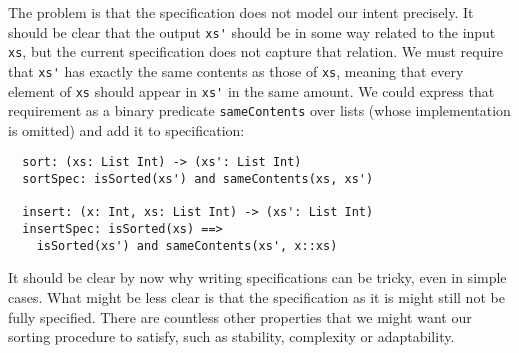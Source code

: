 

The problem is that the specification does not model our intent precisely. It
should be clear that the output \lstinline{xs'} should be in some way related to
the input \lstinline{xs}, but the current specification does not capture that
relation. We must require that \lstinline{xs'} has exactly the same contents as
those of \lstinline{xs}, meaning that every element of \lstinline{xs} should
appear in \lstinline{xs'} in the same amount. We could express that requirement
as a binary predicate \lstinline{sameContents} over lists (whose implementation
is omitted) and add it to specification:

\begin{lstlisting}
  sort: (xs: List Int) -> (xs': List Int)
  sortSpec: isSorted(xs') and sameContents(xs, xs')

  insert: (x: Int, xs: List Int) -> (xs': List Int)
  insertSpec: isSorted(xs) ==>
    isSorted(xs') and sameContents(xs', x::xs)
\end{lstlisting}

It should be clear by now why writing specifications can be tricky, even in
simple cases. What might be less clear is that the specification as it is might
still not be fully specified. There are countless other properties that we might
want our sorting procedure to satisfy, such as stability, complexity or
adaptability.